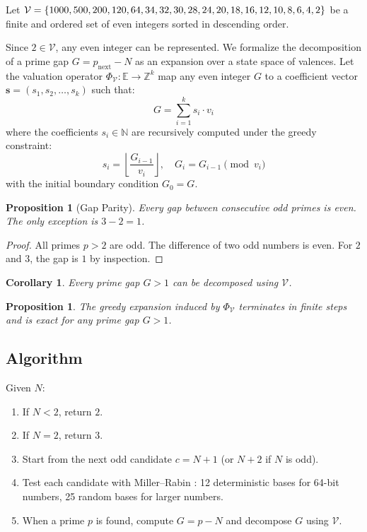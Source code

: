\documentclass{sbc2023-pdf}%
\theoremstyle{plain}
\newtheorem{proposition}[theorem]{Proposition}
\newtheorem{corollary}[theorem]{Corollary}
\begin{document}
Let \(\mathcal{V} = \{1000,500,200,120,64,34,32,30,28,24,20,18,\\
16,12,10,8,6,4,2\}\) be a finite and ordered set of even integers sorted in descending order.

Since \(2 \in \mathcal{V}\), any even integer can be represented. We formalize the decomposition of a prime gap \(G = p_{\text{next}} - N\) as an expansion over a state space of valences. Let the valuation operator \(\Phi_{\mathcal{V}}: \mathbb{E} \to \mathbb{Z}^k\) map any even integer \(G\) to a coefficient vector \(\mathbf{s} = (s_1, s_2, \dots, s_k)\) such that:
\[
G = \sum_{i=1}^{k} s_i \cdot v_i
\]
where the coefficients \(s_i \in \mathbb{N}\) are recursively computed under the greedy constraint:
\[
s_i = \left\lfloor \frac{G_{i-1}}{v_i} \right\rfloor,\quad
G_i = G_{i-1} \pmod{v_i}
\]
with the initial boundary condition \(G_0 = G\).

\begin{proposition}[Gap Parity]
\label{prop:parity}
Every gap between consecutive odd primes is even. The only exception is \(3-2=1\).
\end{proposition}
\begin{proof}
All primes \(p>2\) are odd. The difference of two odd numbers is even. For \(2\) and \(3\), the gap is \(1\) by inspection.
\end{proof}

\begin{corollary}
\label{coro:decomp}
Every prime gap \(G>1\) can be decomposed using \(\mathcal{V}\).
\end{corollary}

\begin{proposition}
The greedy expansion induced by \(\Phi_{\mathcal{V}}\) terminates in finite steps and is exact for any prime gap \(G > 1\).
\end{proposition}

\subsection{Algorithm}
\label{sec:algo}

Given \(N\):
\begin{enumerate}
  \item If \(N<2\), return \(2\).
  \item If \(N=2\), return \(3\).
  \item Start from the next odd candidate \(c=N+1\) (or \(N+2\) if \(N\) is odd).
  \item Test each candidate with Miller--Rabin \citep{rabin1980}: 12 deterministic bases for 64-bit numbers, 25 random bases for larger numbers.
  \item When a prime \(p\) is found, compute \(G=p-N\) and decompose \(G\) using \(\mathcal{V}\).
\end{enumerate}
\end{document}
